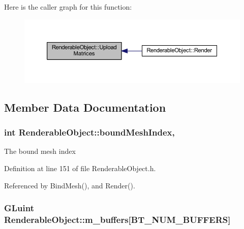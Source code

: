 Here is the caller graph for this function\+:\nopagebreak
\begin{figure}[H]
\begin{center}
\leavevmode
\includegraphics[width=350pt]{class_renderable_object_ac504cf0d249e194eda261b45f629a7b8_icgraph}
\end{center}
\end{figure}




\subsection{Member Data Documentation}
\subsubsection[{\texorpdfstring{bound\+Mesh\+Index}{boundMeshIndex}}]{\setlength{\rightskip}{0pt plus 5cm}int Renderable\+Object\+::bound\+Mesh\+Index\hspace{0.3cm}{\ttfamily [mutable]}, {\ttfamily [private]}}\hypertarget{class_renderable_object_abcef64954c2b642329db5a14a66a6fd6}{}\label{class_renderable_object_abcef64954c2b642329db5a14a66a6fd6}


The bound mesh index 



Definition at line 151 of file Renderable\+Object.\+h.



Referenced by Bind\+Mesh(), and Render().

\subsubsection[{\texorpdfstring{m\+\_\+buffers}{m_buffers}}]{\setlength{\rightskip}{0pt plus 5cm}G\+Luint Renderable\+Object\+::m\+\_\+buffers\mbox{[}{\bf B\+T\+\_\+\+N\+U\+M\+\_\+\+B\+U\+F\+F\+E\+RS}\mbox{]}\hspace{0.3cm}{\ttfamily [private]}}\hypertarget{class_renderable_object_abee52bb51bcb4392073cbb890d39a216}{}\label{class_renderable_object_abee52bb51bcb4392073cbb890d39a216}


